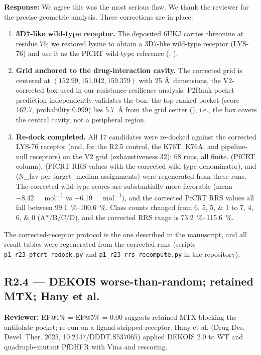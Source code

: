 \documentclass[11pt]{article}
\begin{document}
\textbf{Response:} We agree this was the most serious flaw. We thank the reviewer for the
precise geometric analysis. Three corrections are in place:
\begin{enumerate}[leftmargin=1.6em]
\item \textbf{3D7-like wild-type receptor.} The deposited 6UKJ carries threonine at residue 76;
we restored lysine to obtain a 3D7-like wild-type receptor (LYS-76) and use it as the PfCRT
wild-type reference (; ).
\item \textbf{Grid anchored to the drug-interaction cavity.} The corrected grid is centered at
$(152.99, 151.042, 159.379)$ with 25 \AA\ dimensions, the V2-corrected box used in our
resistance-resilience analysis. P2Rank pocket prediction independently validates the box: the
top-ranked pocket (score \num{162.7}, probability \num{0.999}) lies \qty{5.7}{\angstrom} from the grid center (), i.e., the box covers the central cavity, not a peripheral region.
\item \textbf{Re-dock completed.} All 17 candidates were re-docked against the corrected
LYS-76 receptor (and, for the R2.5 control, the K76T, K76A, and pipeline-null receptors) on
the V2 grid (exhaustiveness \num{32}): \num{68} runs, all finite.  (PfCRT column), 
(PfCRT RRS values with the corrected wild-type denominator), and  (N\_fav per-target-
median assignments) were regenerated from these runs. The corrected wild-type scores are
substantially more favorable (mean \qty{-8.42}{\kilo\calorie\per\mole} vs \qty{-6.19}{\kilo\calorie\per\mole}), and the corrected
PfCRT RRS values all fall between \qtyrange{99.1}{100.6}{\percent}. Class counts changed from \numlist{6;5;5;1} to
\numlist{7;4;6;0} (A*/B/C/D), and the corrected RRS range is \qtyrange{73.2}{115.6}{\percent}.
\end{enumerate}
The corrected-receptor protocol is the one described in the manuscript, and all result tables
were regenerated from the corrected runs (scripts \texttt{p1\_r23\_pfcrt\_redock.py} and
\texttt{p1\_r23\_rrs\_recompute.py} in the repository).

\subsection*{R2.4 --- DEKOIS worse-than-random; retained MTX; Hany et al.}
\textbf{Reviewer:} EF@1\% = EF@5\% = 0.00 suggests retained MTX blocking the antifolate pocket;
re-run on a ligand-stripped receptor; Hany et al. (Drug Des. Devel. Ther. 2025,
10.2147/DDDT.S537065) applied DEKOIS 2.0 to WT and quadruple-mutant PfDHFR with Vina and
rescoring.
\end{document}
